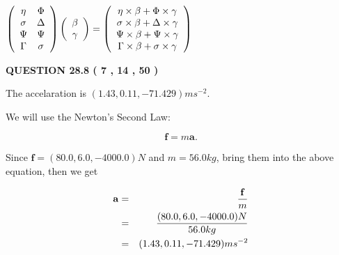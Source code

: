 \documentclass[12pt]{article}
\begin{document}
$  %
 \left( \begin{array}
 {
 c
 c
 }
 \eta & 
 \Phi \\ 
 \sigma & 
 \Delta \\ 
 \Psi & 
 \Psi \\ 
 \Gamma & 
 \sigma
 \end{array} \right)
 \left( \begin{array}
 {
 c
 }
 \beta \\ 
 \gamma
 \end{array} \right)
=
 \left( \begin{array}
 {
 c
 }
  \eta \times  \beta +  \Phi \times  \gamma \\ 
  \sigma \times  \beta +  \Delta \times  \gamma \\ 
  \Psi \times  \beta +  \Psi \times  \gamma \\ 
  \Gamma \times  \beta +  \sigma \times  \gamma
 \end{array} \right)
$
 
 
 
 
 
\noindent{}

 
 
  
\vspace{0.2in}
  
{\textbf{\Large{QUESTION
28.8 
 (           7 ,          14 ,          50 )
}}}
  
  
 
 
\noindent{}
 
 
  The accelaration is $  %
(
1.43,
0.11,
-71.429)
ms^{-2} $.
 
 
 
 
 
 
\noindent{}

We will use the Newton's Second Law:
 
\[
\mathbf{f}=m\mathbf{a}.
\]
 
Since $\mathbf{f}= %
(80.0 , 6.0 , -4000.0) N$
and $m= %
56.0kg$, bring them into the above equation, then we get
 
\begin{eqnarray*}
\mathbf{a}&=&\frac{\mathbf{f}}m  \\
&=&\frac{ %
(80.0 , 6.0 , -4000.0) N}{ %
56.0kg}  \\
&=& %
(1.43 , 0.11 , -71.429) ms^{-2}
\end{eqnarray*}
 
\end{document}

